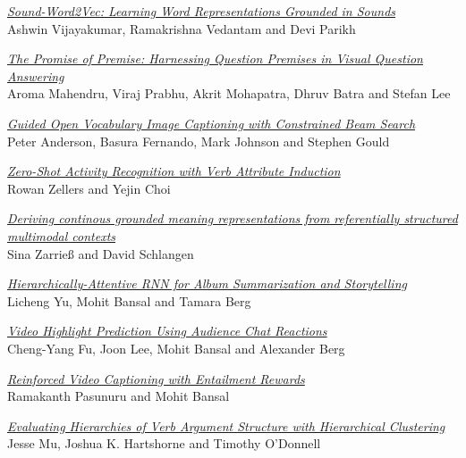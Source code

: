 \hyperlink{page.929}{\em Sound-Word2Vec: Learning Word Representations Grounded in Sounds}\samepage \\
\hspace*{7mm} Ashwin Vijayakumar, Ramakrishna Vedantam and Devi Parikh\dotfill {}

\hyperlink{page.935}{\em The Promise of Premise: Harnessing Question Premises in Visual Question Answering}\samepage \\
\hspace*{7mm} Aroma Mahendru, Viraj Prabhu, Akrit Mohapatra, Dhruv Batra and Stefan Lee\dotfill {}

\hyperlink{page.945}{\em Guided Open Vocabulary Image Captioning with Constrained Beam Search}\samepage \\
\hspace*{7mm} Peter Anderson, Basura Fernando, Mark Johnson and Stephen Gould\dotfill {}

\hyperlink{page.955}{\em Zero-Shot Activity Recognition with Verb Attribute Induction}\samepage \\
\hspace*{7mm} Rowan Zellers and Yejin Choi\dotfill {}

\hyperlink{page.968}{\em Deriving continous grounded meaning representations from referentially structured multimodal contexts}\samepage \\
\hspace*{7mm} Sina Zarrie{\ss} and David Schlangen\dotfill {}

\hyperlink{page.975}{\em Hierarchically-Attentive RNN for Album Summarization and Storytelling}\samepage \\
\hspace*{7mm} Licheng Yu, Mohit Bansal and Tamara Berg\dotfill {}

\hyperlink{page.981}{\em Video Highlight Prediction Using Audience Chat Reactions}\samepage \\
\hspace*{7mm} Cheng-Yang Fu, Joon Lee, Mohit Bansal and Alexander Berg\dotfill {}

\hyperlink{page.988}{\em Reinforced Video Captioning with Entailment Rewards}\samepage \\
\hspace*{7mm} Ramakanth Pasunuru and Mohit Bansal\dotfill {}

\hyperlink{page.995}{\em Evaluating Hierarchies of Verb Argument Structure with Hierarchical Clustering}\samepage \\
\hspace*{7mm} Jesse Mu, Joshua K. Hartshorne and Timothy O'Donnell\dotfill {}


